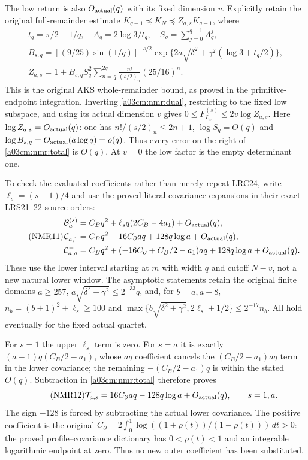 \documentclass[11pt,a4paper]{article}
\begin{document}
The low return is also $O_{\rm actual}(q)$ with its fixed dimension
$v$. Explicitly retain the original full-remainder estimate
$K_{q-1}\preceq K_N\preceq Z_{a,s}K_{q-1}$, where
\begin{equation}\tag{NMR10}\label{a03cm:nmr:Z}
\begin{gathered}
t_q=\pi/2-1/q,\quad A_q=2\log3/t_q,\quad
S_q=\sum_{j=0}^{q-1}A_q^j,\\
B_{s,q}=[(9/25)\sin(1/q)]^{-s/2}
        \exp\{2a\sqrt{\delta^2+\gamma^2}(\log3+t_q/2)\},\\
Z_{a,s}=1+B_{s,q}S_q^2
           \sum_{n=q}^{2q}\frac{n!}{(s/2)_n}(25/16)^n .
\end{gathered}
\end{equation}
This is the original AKS whole-remainder bound, as proved in the
primitive-endpoint integration. Inverting \eqref{a03cm:nmr:dual},
restricting to the fixed low subspace, and using its actual dimension
$v$ gives $0\leq F_{L_v}^{(s)}\leq2v\log Z_{a,s}$.
Here $\log Z_{a,s}=O_{\rm actual}(q)$: one has
$n!/(s/2)_n\leq2n+1$, $\log S_q=O(q)$ and
$\log B_{s,q}=O_{\rm actual}(a\log q)=o(q)$.
Thus every error on the right of \eqref{a03cm:nmr:total} is $O(q)$.
At $v=0$ the low factor is the empty determinant one.

To check the evaluated coefficients rather than merely repeat LRC24,
write $\ell_s=(s-1)/4$ and use the proved literal covariance
expansions in their exact LRS21--22 source orders:
\begin{equation}\tag{NMR11}\label{a03cm:nmr:covariances}
\begin{aligned}
\mathcal B_a^{(s)}
 &=C_Bq^2+\ell_sq(2C_B-4a_1)+O_{\rm actual}(q),\\
\mathcal C^-_{a,1}
 &=C_Bq^2-16C_\partial aq+128q\log a+O_{\rm actual}(q),\\
\mathcal C^-_{a,a}
 &=C_Bq^2+(-16C_\partial+C_B/2-a_1)aq
                  +128q\log a+O_{\rm actual}(q).
\end{aligned}
\end{equation}
These use the lower interval starting at $m$ with width $q$ and
cutoff $N-v$, not a new natural lower window. The asymptotic
statements retain the original finite domains
$a\geq257$,
$a\sqrt{\delta^2+\gamma^2}\leq2^{-33}q$, and, for $b=a,a-8$,
$n_b=(b+1)^2+\ell_s\geq100$ and
$\max\{b\sqrt{\delta^2+\gamma^2},2\ell_s+1/2\}\leq2^{-17}n_b$.
All hold eventually for the fixed actual quartet.

For $s=1$ the upper $\ell_s$ term is zero. For $s=a$ it is exactly
$(a-1)q(C_B/2-a_1)$, whose $aq$ coefficient cancels the
$(C_B/2-a_1)aq$ term in the lower covariance; the remaining
$-(C_B/2-a_1)q$ is within the stated $O(q)$.
Subtraction in \eqref{a03cm:nmr:total} therefore proves
\begin{equation}\tag{NMR12}\label{a03cm:nmr:native-value}
\mathcal T_{a,s}
=16C_\partial aq-128q\log a+O_{\rm actual}(q),
\qquad s=1,a .
\end{equation}
The sign $-128$ is forced by subtracting the actual lower covariance.
The positive coefficient is the original
$C_\partial=2\int_0^1\log((1+\rho(t))/(1-\rho(t)))\,dt>0$:
the proved profile--covariance dictionary has
$0<\rho(t)<1$ and an integrable logarithmic endpoint at zero.
Thus no new outer coefficient has been substituted.
\end{document}
